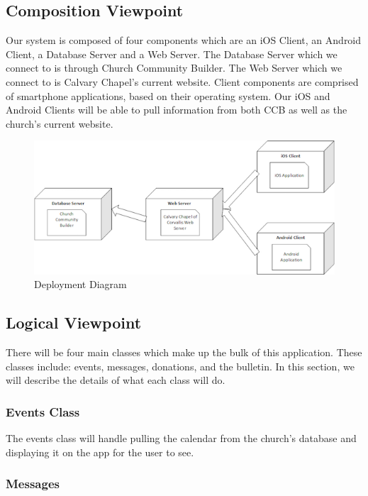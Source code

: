 \documentclass[letterpaper,10pt,draftclsnofoot,onecolumn,titlepage]{IEEEtran}
\begin{document}
		\subsection{Composition Viewpoint}
			Our system is composed of four components which are an iOS Client, an Android Client, a Database Server and a Web Server.
			The Database Server which we connect to is through Church Community Builder.
			The Web Server which we connect to is Calvary Chapel's current website.
			Client components are comprised of smartphone applications, based on their operating system.
			Our iOS and Android Clients will be able to pull information from both CCB as well as the church's current website.

		\begin{figure}[H]
			\centering
			\includegraphics[natwidth=552, natheight=245]{Deployment.png}
			\caption{Deployment Diagram}
			\label{fig:deployment}
		\end{figure}

		\subsection{Logical Viewpoint}
			There will be four main classes which make up the bulk of this application.
			These classes include: events, messages, donations, and the bulletin.
			In this section, we will describe the details of what each class will do.

			\subsubsection{Events Class}
				The events class will handle pulling the calendar from the church's database and displaying it on the app for the user to see.

			\subsubsection{Messages}
\end{document}
